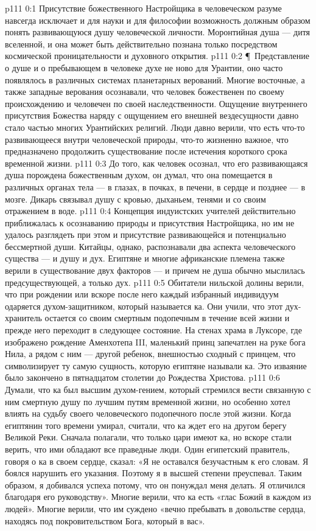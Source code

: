 \vs p111 0:1 Присутствие божественного Настройщика в человеческом разуме навсегда исключает и для науки и для философии возможность должным образом понять развивающуюся душу человеческой личности. Моронтийная душа --- дитя вселенной, и она может быть действительно познана только посредством космической проницательности и духовного открытия.
\vs p111 0:2 \P\ Представление о душе и о пребывающем в человеке духе не ново для Урантии, оно часто появлялось в различных системах планетарных верований. Многие восточные, а также западные верования осознавали, что человек божественен по своему происхождению и человечен по своей наследственности. Ощущение внутреннего присутствия Божества наряду с ощущением его внешней вездесущности давно стало частью многих Урантийских религий. Люди давно верили, что есть что\hyp{}то развивающееся внутри человеческой природы, что\hyp{}то жизненно важное, что предназначено продолжить существование после истечения короткого срока временной жизни.
\vs p111 0:3 До того, как человек осознал, что его развивающаяся душа порождена божественным духом, он думал, что она помещается в различных органах тела --- в глазах, в почках, в печени, в сердце и позднее --- в мозге. Дикарь связывал душу с кровью, дыханьем, тенями и со своим отражением в воде.
\vs p111 0:4 Концепция  индуистских учителей действительно приближалась к осознаванию природы и присутствия Настройщика, но им не удалось разглядеть при этом и присутствие развивающейся и потенциально бессмертной души. Китайцы, однако, распознавали два аспекта человеческого существа ---  и  душу и дух. Египтяне и многие африканские племена также верили в существование двух факторов ---  и  причем не душа обычно мыслилась предсуществующей, а только дух.
\vs p111 0:5 Обитатели нильской долины верили, что при рождении или вскоре после него каждый избранный индивидуум одаряется духом\hyp{}защитником, который называется ка. Они учили, что этот дух\hyp{}хранитель остается со своим смертным подопечным в течение всей жизни и прежде него переходит в следующее состояние. На стенах храма в Луксоре, где изображено рождение Аменхотепа III, маленький принц запечатлен на руке бога Нила, а рядом с ним --- другой ребенок, внешностью сходный с принцем, что символизирует ту самую сущность, которую египтяне называли ка. Это изваяние было закончено в пятнадцатом столетии до Рождества Христова.
\vs p111 0:6 Думали, что ка был высшим духом\hyp{}гением, который стремился вести связанную с ним смертную душу по лучшим путям временной жизни, но особенно хотел влиять на судьбу своего человеческого подопечного после этой жизни. Когда египтянин того времени умирал, считали, что ка ждет его на другом берегу Великой Реки. Сначала полагали, что только цари имеют ка, но вскоре стали верить, что ими обладают все праведные люди. Один египетский правитель, говоря о ка в своем сердце, сказал: «Я не оставался безучастным к его словам. Я боялся нарушить его указания. Поэтому я в высшей степени преуспевал. Таким образом, я добивался успеха потому, что он понуждал меня делать. Я отличился благодаря его руководству». Многие верили, что ка есть «глас Божий в каждом из людей». Многие верили, что им суждено «вечно пребывать в довольстве сердца, находясь под покровительством Бога, который в вас».
